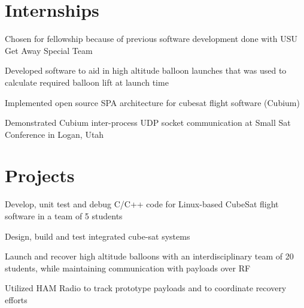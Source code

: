\documentclass[]{deedy-resume-openfont}
\begin{document}
\begin{minipage}[t]{0.66\textwidth} 


\section{Internships}

\vspace{\topsep} %
\begin{tightemize}
\item Chosen for fellowship because of previous software development done with USU Get Away Special Team
\item Developed software to aid in high altitude balloon launches that was used to calculate required balloon lift at launch time
\item Implemented open source SPA architecture for cubesat flight software (Cubium)
\item Demonstrated Cubium inter-process UDP socket communication at Small Sat Conference in Logan, Utah
\end{tightemize}
\sectionsep



\section{Projects}

\begin{tightemize}
\item Develop, unit test and debug C/C++ code for Linux-based CubeSat flight software in a team of 5 students
\item Design, build and test integrated cube-sat systems
\item Launch and recover high altitude balloons with an interdisciplinary team of 20 students, while maintaining communication with payloads over RF
\item Utilized HAM Radio to track prototype payloads and to coordinate recovery efforts
\end{tightemize}
\sectionsep


\end{minipage}
\end{document}
